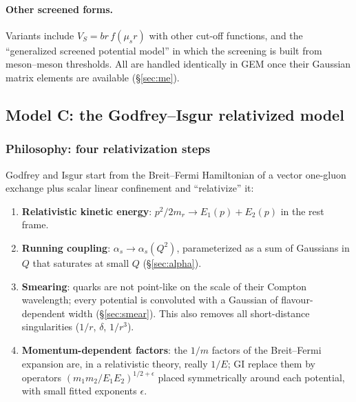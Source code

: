 \documentclass[11pt,a4paper]{article}
\numberwithin{equation}{section}
\theoremstyle{definition}
\theoremstyle{plain}
\theoremstyle{remark}
\numberwithin{algorithm}{section}
\newcommand{\as}{\alpha_s}
\newcommand{\mr}{m_r}
\newcommand{\mus}{\mu_s}
\begin{document}
\paragraph{Other screened forms.} Variants include $V_S=br\,f(\mus r)$ with other cut-off functions, and the ``generalized screened potential model'' in which the screening is built from meson--meson thresholds. All are handled identically in GEM once their Gaussian matrix elements are available (\S\ref{sec:me}).

\subsection{Model C: the Godfrey--Isgur relativized model}\label{sec:modelC}
\subsubsection{Philosophy: four relativization steps}
Godfrey and Isgur start from the Breit--Fermi Hamiltonian of a vector one-gluon exchange plus scalar linear confinement and ``relativize'' it:
\begin{enumerate}[leftmargin=1.5em,itemsep=2pt]
\item \textbf{Relativistic kinetic energy}: $p^2/2\mr\to E_1(p)+E_2(p)$ in the rest frame.
\item \textbf{Running coupling}: $\as\to\as(Q^2)$, parameterized as a sum of Gaussians in $Q$ that saturates at small $Q$ (\S\ref{sec:alpha}).
\item \textbf{Smearing}: quarks are not point-like on the scale of their Compton wavelength; every potential is convoluted with a Gaussian of flavour-dependent width (\S\ref{sec:smear}). This also removes all short-distance singularities ($1/r$, $\delta$, $1/r^3$).
\item \textbf{Momentum-dependent factors}: the $1/m$ factors of the Breit--Fermi expansion are, in a relativistic theory, really $1/E$; GI replace them by operators $(m_1m_2/E_1E_2)^{1/2+\epsilon}$ placed symmetrically around each potential, with small fitted exponents $\epsilon$.
\end{enumerate}
\end{document}
